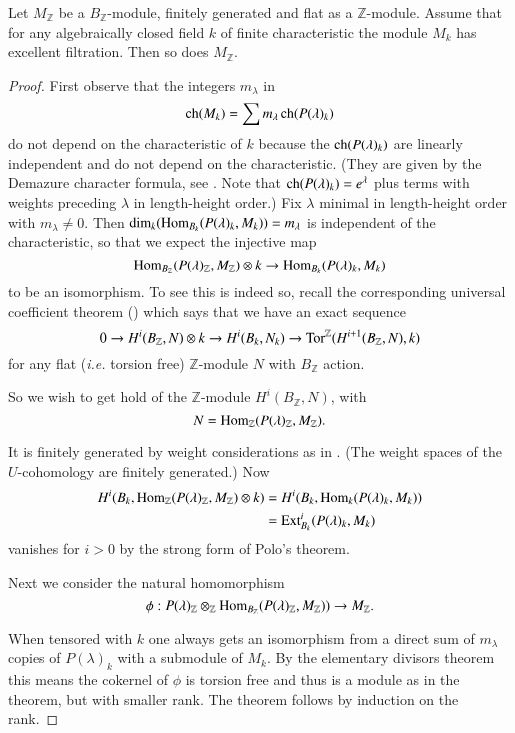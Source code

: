 \begin{theorem}\label{chap7-thm7.2.6}
Let $M_{\mathbb{Z}}$ be a $B_{\mathbb{Z}}$-module, finitely generated
and flat as a $\mathbb{Z}$-module. Assume that for any algebraically
closed field $k$ of finite characteristic the module $M_{k}$ has
excellent filtration. Then so does $M_{\mathbb{Z}}$.
\end{theorem}

\begin{proof}
First observe that the integers $m_{\lambda}$ in 
$$
\operatorname{ch}(M_{k})=\sum m_{\lambda}\operatorname{ch}(P(\lambda)_{k})
$$ 
do not depend on the characteristic of
$k$ because the $\operatorname{ch}(P(\lambda)_{k})$ are linearly independent and do
not depend on the characteristic. (They are given by the Demazure
character formula, see \cite[II Proposition 14.18]{key11}. Note that
$\operatorname{ch}(P(\lambda)_{k})=e^{\lambda}$ plus terms with weights preceding
$\lambda$ in length-height order.) Fix $\lambda$ minimal in
length-height order with $m_{\lambda}\neq 0$. Then
$\dim_{k}(\operatorname{Hom}_{B_{k}}(P(\lambda)_{k},M_{k}))=m_{\lambda}$ is
independent of the characteristic, so that we expect the injective map
$$
\operatorname{Hom}_{B_{\mathbb{Z}}}(P(\lambda)_{\mathbb{Z}},M_{\mathbb{Z}})\otimes
k\to \operatorname{Hom}_{B_{k}}(P(\lambda)_{k},M_{k})
$$ 
to be an isomorphism. To see
this is indeed so, recall the corresponding universal coefficient
theorem (\cite[I 4.18]{key11}) which says that we have an exact
sequence
$$
0\to H^{i}(B_{\mathbb{Z}},N)\otimes k\to H^{i}(B_{k},N_{k})\to
\operatorname{Tor}^{\mathbb{Z}}(H^{i+1}(B_{\mathbb{Z}},N),k)
$$
for any flat ({\em i.e.} torsion free) $\mathbb{Z}$-module $N$ with
$B_{\mathbb{Z}}$ action.

So we wish to get hold of the $\mathbb{Z}$-module
$H^{i}(B_{\mathbb{Z}},N)$, with
$$
N=\operatorname{Hom}_{\mathbb{Z}}(P(\lambda)_{\mathbb{Z}},M_{\mathbb{Z}}).
$$ 

It is
finitely generated by weight considerations as in \cite[II Prop.\@
  4.10]{key11}. (The weight spaces of the $U$-cohomology are finitely
generated.) Now
\begin{align*}
H^{i}(B_{k},\operatorname{Hom}_{\mathbb{Z}}(P(\lambda)_{\mathbb{Z}},M_{\mathbb{Z}})\otimes
k)&=H^{i}(B_{k},\operatorname{Hom}_{k}(P(\lambda)_{k},M_{k}))\\ 
&=\operatorname{Ext}^{i}_{B_{k}}(P(\lambda)_{k},M_{k})
\end{align*}
vanishes for $i>0$ by the strong form of Polo's theorem.


Next we consider the natural homomorphism
$$
\phi:P(\lambda)_{\mathbb{Z}}\otimes_{\mathbb{Z}}\operatorname{Hom}_{B_{\mathbb{Z}}}(P(\lambda)_{\mathbb{Z}},M_{\mathbb{Z}}))\to
M_{\mathbb{Z}}.
$$

When tensored with $k$ one always gets an isomorphism from a direct
sum of $m_{\lambda}$ copies of $P(\lambda)_{k}$ with a submodule of
$M_{k}$. By the elementary divisors theorem\pageoriginale 
this\label{page73} means the cokernel of $\phi$ is torsion free and thus is a module
as in the theorem, but with smaller rank. The theorem follows by
induction on the rank.
\end{proof}

